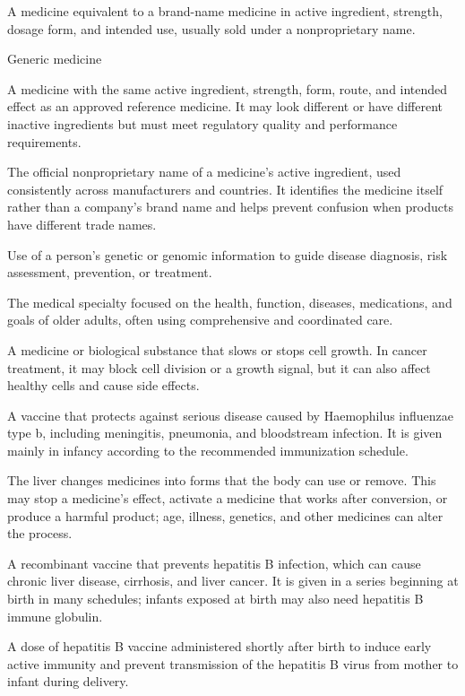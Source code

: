  A medicine equivalent to a brand-name medicine in active ingredient, strength, dosage form, and intended use, usually sold under a nonproprietary name.

\synonyms
Generic medicine

 A medicine with the same active ingredient, strength, form, route, and intended effect as an approved reference medicine. It may look different or have different inactive ingredients but must meet regulatory quality and performance requirements.

 The official nonproprietary name of a medicine's active ingredient, used consistently across manufacturers and countries. It identifies the medicine itself rather than a company's brand name and helps prevent confusion when products have different trade names.

 Use of a person’s genetic or genomic information to guide disease diagnosis, risk assessment, prevention, or treatment.

 The medical specialty focused on the health, function, diseases, medications, and goals of older adults, often using comprehensive and coordinated care.

 A medicine or biological substance that slows or stops cell growth. In cancer treatment, it may block cell division or a growth signal, but it can also affect healthy cells and cause side effects.

 A vaccine that protects against serious disease caused by Haemophilus influenzae type b, including meningitis, pneumonia, and bloodstream infection. It is given mainly in infancy according to the recommended immunization schedule.

 The liver changes medicines into forms that the body can use or remove. This may stop a medicine’s effect, activate a medicine that works after conversion, or produce a harmful product; age, illness, genetics, and other medicines can alter the process.

 A recombinant vaccine that prevents hepatitis B infection, which can cause chronic liver disease, cirrhosis, and liver cancer. It is given in a series beginning at birth in many schedules; infants exposed at birth may also need hepatitis B immune globulin.

 A dose of hepatitis B vaccine administered shortly after birth to induce early active immunity and prevent transmission of the hepatitis B virus from mother to infant during delivery.

